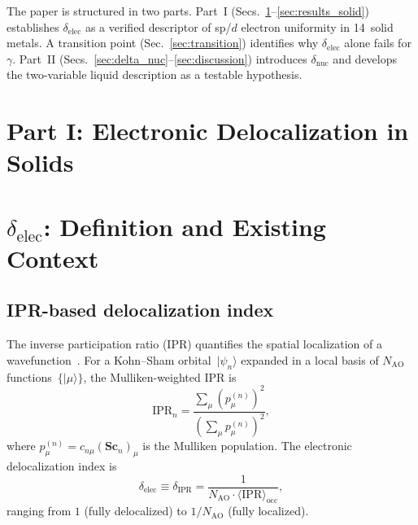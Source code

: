 \documentclass[twocolumn,showpacs,preprintnumbers,amsmath,amssymb,prb]{revtex4-2}
\begin{document}
The paper is structured in two parts.
Part~I (Secs.~\ref{sec:delta_elec}--\ref{sec:results_solid})
establishes $\delta_\mathrm{elec}$ as a verified descriptor
of sp/$d$ electron uniformity in 14~solid metals.
A transition point (Sec.~\ref{sec:transition}) identifies
why $\delta_\mathrm{elec}$ alone fails for $\gamma$.
Part~II (Secs.~\ref{sec:delta_nuc}--\ref{sec:discussion})
introduces $\delta_\mathrm{nuc}$ and develops the
two-variable liquid description as a testable hypothesis.



\section*{Part I: Electronic Delocalization in Solids}

\section{$\delta_\mathrm{elec}$: Definition and Existing Context}
\label{sec:delta_elec}

\subsection{IPR-based delocalization index}

The inverse participation ratio (IPR) quantifies the spatial
localization of a wavefunction~\cite{Bell1970,Wegner1980}.
For a Kohn--Sham orbital~$|\psi_n\rangle$ expanded in a local
basis of $N_\mathrm{AO}$ functions~$\{|\mu\rangle\}$,
the Mulliken-weighted IPR is
\begin{equation}
  \mathrm{IPR}_n = \frac{\sum_\mu (p_\mu^{(n)})^2}
                        {\left(\sum_\mu p_\mu^{(n)}\right)^2},
  \label{eq:ipr}
\end{equation}
where $p_\mu^{(n)} = c_{n\mu} (\mathbf{S} \mathbf{c}_n)_\mu$
is the Mulliken population.
The electronic delocalization index is
\begin{equation}
  \delta_\mathrm{elec} \equiv \delta_\mathrm{IPR}
  = \frac{1}{N_\mathrm{AO} \cdot
    \langle \mathrm{IPR} \rangle_\mathrm{occ}},
  \label{eq:delta_elec}
\end{equation}
ranging from $1$ (fully delocalized) to $1/N_\mathrm{AO}$
(fully localized).
\end{document}
